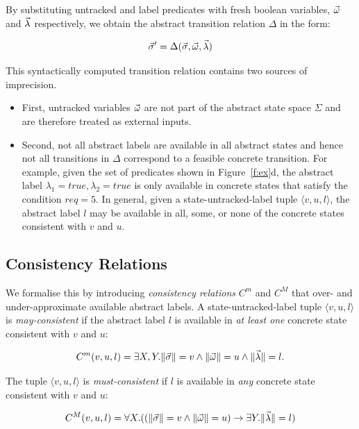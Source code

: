 By substituting untracked and label predicates with fresh boolean variables, $\vec{\omega}$ and $\vec{\lambda}$ respectively, we obtain the abstract transition relation $\Delta$ in the form:

$$
\vec{\sigma}'=\Delta(\vec{\sigma},\vec{\omega},\vec{\lambda})
$$

This syntactically computed transition relation contains two sources of imprecision.  

\begin{itemize}
    \item First, untracked variables $\vec{\omega}$ are not part of the abstract state space $\Sigma$ and are therefore treated as external inputs.  
    \item Second, not all abstract labels  are available in all abstract states and hence not all transitions in $\Delta$ correspond to a feasible concrete transition.  For example, given the set of predicates shown in Figure~\ref{f:ex}d, the abstract label $\lambda_1 = true, \lambda_2 = true$ is only available in concrete states that satisfy the condition $req=5$.  In general, given a state-untracked-label tuple $\langle v,u,l\rangle$, the abstract label $l$ may be available in all, some, or none of the concrete states consistent with $v$ and $u$.  
\end{itemize}

\subsection{Consistency Relations}

We formalise this by introducing \emph{consistency relations} $C^m$ and $C^M$ that over- and under-approximate available abstract labels.  A state-untracked-label tuple $\langle v,u,l\rangle$ is \emph{may-consistent} if the abstract label $l$ is available in \emph{at least one} concrete state consistent with $v$ and $u$:

\begin{equation} 
    \label{eqn:cm}
    C^m(v,u,l) = \exists X,Y. \|\vec{\sigma}\|=v \land \|\vec{\omega}\|=u \land \|\vec{\lambda}\|=l.
\end{equation}

The tuple $\langle v,u,l\rangle$ is \emph{must-consistent} if $l$ is available in \emph{any} concrete state consistent with $v$ and $u$:

\begin{equation}
    \label{eqn:cM}
    C^M(v,u,l) = \forall X . ((\|\vec{\sigma}\|=v \land \|\vec{\omega}\|=u) \rightarrow \exists Y.  \|\vec{\lambda}\|=l)
\end{equation}

